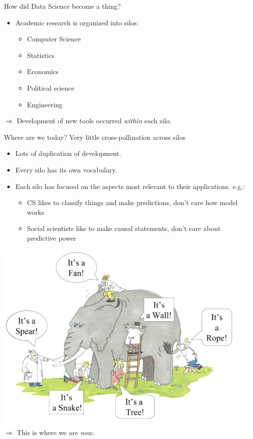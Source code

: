 \documentclass[11pt]{beamer}
\begin{document}
\begin{frame}[c]{How did Data Science become a thing?}

\begin{itemize}
	\item Academic research is organized into silos:
	\pause
	\begin{itemize}
		\item Computer Science
		\item Statistics
		\item Economics
		\item Political science
		\item Engineering
	\end{itemize}
\end{itemize}
\pause $\Rightarrow$ Development of new tools occurred \emph{within} each silo.
\end{frame}


\begin{frame}[c]{Where are we today?}
Very little cross-pollination across silos
\begin{itemize}
	\pause \item Lots of duplication of development.
	\pause \item Every silo has its own vocabulary.
	\pause \item Each silo has focused on the aspects most relevant to their applications. e.g.:
	\begin{itemize}
		\pause \item CS likes to classify things and make predictions, don't care how model works
		\item Social scientists like to make causal statements, don't care about predictive power
	\end{itemize}
\end{itemize}
\end{frame}

\begin{frame}[c]{}
\pause \includegraphics[width=\textwidth]{blindmenelephant.jpg}
\pause $\Rightarrow$ This is where we are \emph{now.}
\end{frame}
\end{document}
